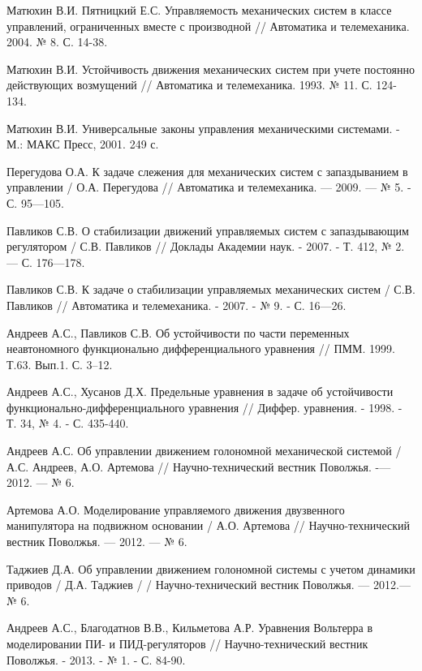 \begin{thebibliography}{10}
	Матюхин В.И. Пятницкий Е.С. Управляемость механических систем в классе управлений, ограниченных вместе с производной // Автоматика и телемеханика. 2004. № 8. С. 14-38.
	
	Матюхин В.И. Устойчивость движения механических систем при учете постоянно действующих возмущений // Автоматика и телемеханика. 1993. № 11. С. 124-134.
	
	Матюхин В.И. Универсальные законы управления механическими системами. - М.: МАКС Пресс, 2001. 249 с.
	
	Перегудова О.А. К задаче слежения для механических систем с запаздыванием в управлении / О.А. Перегудова // Автоматика и телемеханика. — 2009. —  № 5. - С. 95—105.
	
	Павликов С.В. О стабилизации движений управляемых систем с запаздывающим регулятором / С.В. Павликов // Доклады Академии наук. - 2007. - Т. 412, № 2. — С. 176—178.
	
	Павликов С.В. К задаче о стабилизации управляемых механических систем / С.В. Павликов // Автоматика и телемеханика. - 2007. - № 9. - С. 16—26.
	
	Андреев А.С., Павликов С.В. Об устойчивости по части переменных неавтономного функционально дифференциального уравнения // ПММ. 1999. Т.63. Вып.1. С. 3--12.
	
	Андреев А.С., Хусанов Д.Х. Предельные уравнения в задаче об устойчивости функционально-дифференциального уравнения // Диффер. уравнения. - 1998. - Т. 34, № 4. - С. 435-440.
	
	Андреев А.С. Об управлении движением голономной механической системой / А.С. Андреев, А.О. Артемова // Научно-технический вестник Поволжья. -— 2012. — № 6.
	
	Артемова А.О. Моделирование управляемого движения двузвенного манипулятора на подвижном основании / А.О. Артемова // Научно-технический вестник Поволжья. — 2012. — № 6.
	
	Таджиев Д.А. Об управлении движением голономной системы с учетом динамики приводов / Д.А. Таджиев / / Научно-технический вестник Поволжья. — 2012.— № 6.
	
	Андреев А.С., Благодатнов В.В., Кильметова А.Р. Уравнения Вольтерра в моделировании ПИ- и ПИД-регуляторов // Научно-технический вестник Поволжья. - 2013. - № 1. - С. 84-90.
	

\end{thebibliography}
